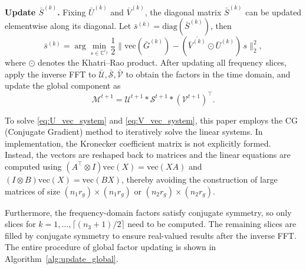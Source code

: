 \documentclass[a4paper,12pt]{article}
\numberwithin{equation}{section}
\numberwithin{algorithm}{section}
\theoremstyle{remark}
\theoremstyle{definition}
\begin{document}
\noindent\textbf{Update $\bar S^{(k)}$.}
Fixing $\bar U^{(k)}$ and $\bar V^{(k)}$, the diagonal matrix $\bar S^{(k)}$ can be updated elementwise along its diagonal. Let $\bar s^{(k)}=\mathrm{diag}(\bar S^{(k)})$, then
\begin{equation}
	\bar s^{(k)} = \arg\min_{s\in\mathbb{C}^{r_g}}
	\frac12\big\|\mathrm{vec}(\bar G^{(k)}) - (\overline{\bar V^{(k)}}\odot \bar U^{(k)})\,s\big\|_2^2,
	\label{eq:S_update_diag}
\end{equation}
where $\odot$ denotes the Khatri--Rao product. After updating all frequency slices, apply the inverse FFT to $\bar{\mathcal{U}},\bar{\mathcal{S}},\bar{\mathcal{V}}$ to obtain the factors in the time domain, and update the global component as
\begin{equation}
	\mathcal{M}^{t+1}=\mathcal{U}^{t+1}*\mathcal{S}^{t+1}*(\mathcal{V}^{t+1})^{\top}.
	\label{eq:M_update_new}
\end{equation}



To solve \eqref{eq:U_vec_system} and \eqref{eq:V_vec_system}, this paper employs the CG (Conjugate Gradient) method to iteratively solve the linear systems. In implementation, the Kronecker coefficient matrix is not explicitly formed. Instead, the vectors are reshaped back to matrices and the linear equations are computed using  
$(A^{\top}\!\otimes I)\mathrm{vec}(X)=\mathrm{vec}(XA)$ and $(I\otimes B)\mathrm{vec}(X)=\mathrm{vec}(BX)$, thereby avoiding the construction of large matrices of size $(n_1 r_g)\times(n_1 r_g)$ or $(n_2 r_g)\times(n_2 r_g)$.

Furthermore, the frequency-domain factors satisfy conjugate symmetry, so only slices for $k=1,\dots,\lceil(n_3+1)/2\rceil$ need to be computed. The remaining slices are filled by conjugate symmetry to ensure real-valued results after the inverse FFT.
The entire procedure of global factor updating is shown in Algorithm~\ref{alg:update_global}.
\end{document}
